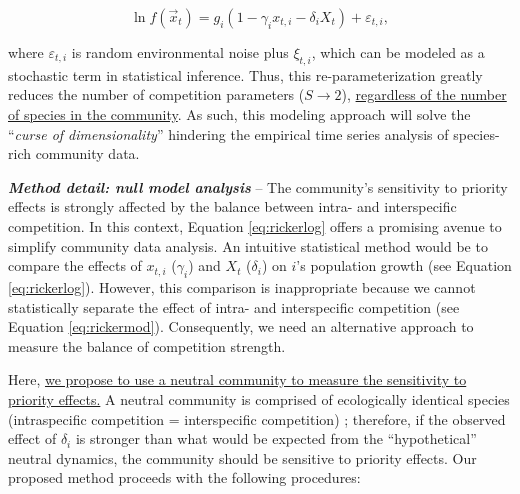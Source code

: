 \documentclass[12pt, class=article, crop=false]{standalone}
\begin{document}
\begin{equation}
\label{eq:rickerlog}
    \ln f(\overset{\rightarrow}{x}_{t}) = g_i (1 - \gamma_i x_{t,i} - \delta_i X_t) + \varepsilon_{t,i},
\end{equation}

where $\varepsilon_{t,i}$ is random environmental noise plus $\xi_{t,i}$, which can be modeled as a stochastic term in statistical inference. Thus, this re-parameterization greatly reduces the number of competition parameters ($S \rightarrow 2$), \ul{regardless of the number of species in the community}.
As such, this modeling approach will solve the ``\textit{curse of dimensionality}'' hindering the empirical time series analysis of species-rich community data.

\textbf{\textit{Method detail: null model analysis}} --
The community's sensitivity to priority effects is strongly affected by the balance between intra- and interspecific competition.
In this context, Equation \ref{eq:rickerlog} offers a promising avenue to simplify community data analysis. 
An intuitive statistical method would be to compare the effects of $x_{t,i}$ ($\gamma_i$) and $X_t$ ($\delta_i$) on $i$'s population growth (see Equation \ref{eq:rickerlog}).
However, this comparison is inappropriate because we cannot statistically separate the effect of intra- and interspecific competition (see Equation \ref{eq:rickermod}).
Consequently, we need an alternative approach to measure the balance of competition strength.

Here, \ul{we propose to use a neutral community to measure the sensitivity to priority effects.} 
A neutral community is comprised of ecologically identical species (intraspecific competition = interspecific competition) \citep{hubbell_unified_2001, loreau_species_2008}; therefore, if the observed effect of $\delta_i$ is stronger than what would be expected from the ``hypothetical'' neutral dynamics, the community should be sensitive to priority effects.
Our proposed method proceeds with the following procedures:
\end{document}
